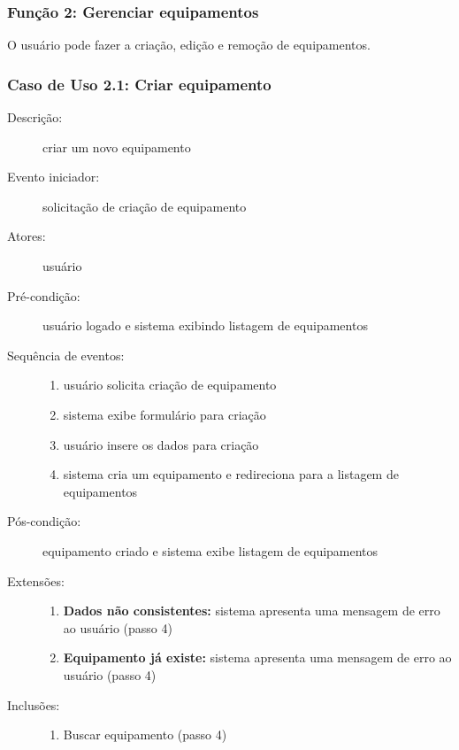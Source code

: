 \subsubsection{Função 2: Gerenciar equipamentos}
O usuário pode fazer a criação, edição e remoção de equipamentos.
%
\subsubsection{Caso de Uso 2.1: Criar equipamento}
\begin{description}
	\item[Descrição:] criar um novo equipamento
	\item[Evento iniciador:] solicitação de criação de equipamento
	\item[Atores:] usuário
	\item[Pré-condição:] usuário logado e sistema exibindo listagem de equipamentos
	\item[Sequência de eventos:] \hfill
		\begin{enumerate}
			\item{usuário solicita criação de equipamento}
			\item{sistema exibe formulário para criação}
			\item{usuário insere os dados para criação}
			\item{sistema cria um equipamento e redireciona para a listagem de equipamentos}
		\end{enumerate}
	\item[Pós-condição:] equipamento criado e sistema exibe listagem de equipamentos
	\item[Extensões:] \hfill
		\begin{enumerate}
			\item{\textbf{Dados não consistentes:} sistema apresenta uma mensagem de erro ao usuário (passo 4)}
			\item{\textbf{Equipamento já existe:} sistema apresenta uma mensagem de erro ao usuário (passo 4)}
		\end{enumerate}
	\item[Inclusões:] \hfill
		\begin{enumerate}
			\item{Buscar equipamento (passo 4)}
		\end{enumerate}
\end{description}
%
